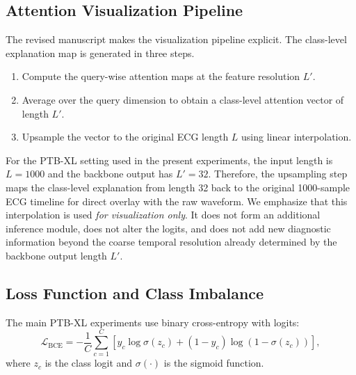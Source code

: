 \documentclass[11pt]{article}
\begin{document}
\subsection{Attention Visualization Pipeline}

The revised manuscript makes the visualization pipeline explicit. The class-level explanation map is generated in three steps.

\begin{enumerate}
    \item Compute the query-wise attention maps at the feature resolution $L'$.
    \item Average over the query dimension to obtain a class-level attention vector of length $L'$.
    \item Upsample the vector to the original ECG length $L$ using linear interpolation.
\end{enumerate}

For the PTB-XL setting used in the present experiments, the input length is $L=1000$ and the backbone output has $L'=32$. Therefore, the upsampling step maps the class-level explanation from length 32 back to the original 1000-sample ECG timeline for direct overlay with the raw waveform. We emphasize that this interpolation is used \emph{for visualization only}. It does not form an additional inference module, does not alter the logits, and does not add new diagnostic information beyond the coarse temporal resolution already determined by the backbone output length $L'$.

\subsection{Loss Function and Class Imbalance}

The main PTB-XL experiments use binary cross-entropy with logits:
\[
\mathcal{L}_{\mathrm{BCE}} = - \frac{1}{C} \sum_{c=1}^{C} \left[
y_c \log \sigma(z_c) + (1-y_c)\log(1-\sigma(z_c))
\right],
\]
where $z_c$ is the class logit and $\sigma(\cdot)$ is the sigmoid function.
\end{document}
